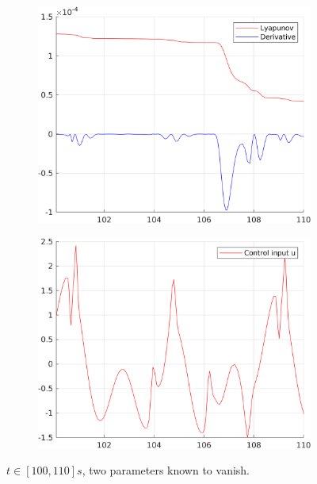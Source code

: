 \documentclass[12pt,a4paper]{article}
\begin{document}
\begin{figure}[H]
\begin{subfigure}{.45\textwidth}
			\includegraphics[width=1\textwidth]{Graphics/NonLinearLyapunovZero2.png}
		\end{subfigure}%
		\begin{subfigure}{.45\textwidth}
			\centering
			\includegraphics[width=1\textwidth]{Graphics/NonLinearControlZero2.png}
		\end{subfigure}
		\caption{$t \in [100,110]s$, two parameters known to vanish.}
	\end{figure}
\end{document}

